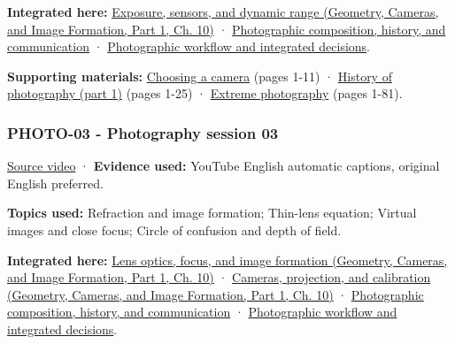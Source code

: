\textbf{Integrated here:} \href{../03-Geometry-Cameras-and-Image-Formation-P01/main.pdf\#nameddest=03-visual-computing-i-ch003-exposure-sensors-and-dynamic-range}{Exposure, sensors, and dynamic range (Geometry, Cameras, and Image Formation, Part 1, Ch. 10)} · \hyperref[04-visual-computing-ii-ch034-photographic-composition-history-and-communication]{Photographic composition, history, and communication} · \hyperref[04-visual-computing-ii-ch034-photographic-workflow-and-integrated-decisions]{Photographic workflow and integrated decisions}.

\textbf{Supporting materials:} \href{https://drive.google.com/open?id=0B6w2XfPHEcZYQlF2U1VjRHRNLUE}{Choosing a camera} (pages 1-11) · \href{https://drive.google.com/open?id=0B6w2XfPHEcZYcm1nc0lRV0h4dzg}{History of photography (part 1)} (pages 1-25) · \href{https://drive.google.com/file/d/0B6w2XfPHEcZYVTZ5YzFzdXc3b0U/view?usp=sharing}{Extreme photography} (pages 1-81).

\subsubsection{PHOTO-03 - Photography session 03}\label{04-visual-computing-ii-ch036-photo-03---photography-session-03}

\hypertarget{04-visual-computing-ii-ch036-photo-03---photography-session-03}{}

\href{https://www.youtube.com/watch?v=Q-hIFIHay9I}{Source video} · \textbf{Evidence used:} YouTube English automatic captions, original English preferred.

\textbf{Topics used:} Refraction and image formation; Thin-lens equation; Virtual images and close focus; Circle of confusion and depth of field.

\textbf{Integrated here:} \href{../03-Geometry-Cameras-and-Image-Formation-P01/main.pdf\#nameddest=03-visual-computing-i-ch003-lens-optics-focus-and-image-formation}{Lens optics, focus, and image formation (Geometry, Cameras, and Image Formation, Part 1, Ch. 10)} · \href{../03-Geometry-Cameras-and-Image-Formation-P01/main.pdf\#nameddest=03-visual-computing-i-ch003-cameras-projection-and-calibration}{Cameras, projection, and calibration (Geometry, Cameras, and Image Formation, Part 1, Ch. 10)} · \hyperref[04-visual-computing-ii-ch034-photographic-composition-history-and-communication]{Photographic composition, history, and communication} · \hyperref[04-visual-computing-ii-ch034-photographic-workflow-and-integrated-decisions]{Photographic workflow and integrated decisions}.

